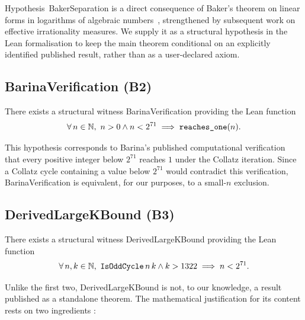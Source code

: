 Hypothesis~\textsf{BakerSeparation} is a direct consequence of Baker's
theorem on linear forms in logarithms of algebraic
numbers~\cite{Baker1966}, strengthened by subsequent work on effective
irrationality measures. We supply it as a structural hypothesis in the
Lean formalisation to keep the main theorem conditional on an
explicitly identified published result, rather than as a user-declared
axiom.

\subsection{\textsf{BarinaVerification} (B2)}

\begin{hypothesis}\label{hyp:barina}
There exists a structural witness \textsf{BarinaVerification} providing
the Lean function
\[
\forall\, n \in \mathbb{N},\ n > 0 \wedge n < 2^{71} \;\Longrightarrow\;
\text{\texttt{reaches\_one}}(n).
\]
\end{hypothesis}

This hypothesis corresponds to Barina's published computational
verification~\cite{Barina2025} that every positive integer below
\(2^{71}\) reaches \(1\) under the Collatz iteration. Since a Collatz
cycle containing a value below \(2^{71}\) would contradict this
verification, \textsf{BarinaVerification} is equivalent, for our
purposes, to a small-\(n\) exclusion.


\subsection{\textsf{DerivedLargeKBound} (B3)}

\begin{hypothesis}\label{hyp:derived}
There exists a structural witness \textsf{DerivedLargeKBound} providing
the Lean function
\[
\forall\, n, k \in \mathbb{N},\ \text{\texttt{IsOddCycle}}\,n\,k \wedge k > 1322
\;\Longrightarrow\; n < 2^{71}.
\]
\end{hypothesis}


Unlike the first two, \textsf{DerivedLargeKBound} is not, to our
knowledge, a result published as a standalone theorem. The mathematical
justification for its content rests on two ingredients :

